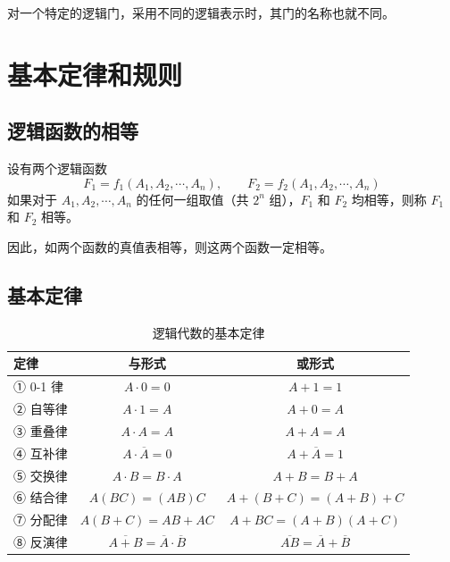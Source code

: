 \begin{note}
	对一个特定的逻辑门，采用不同的逻辑表示时，其门的名称也就不同。
\end{note}

\section{基本定律和规则}
\label{sec:基本定律和规则}

\subsection{逻辑函数的相等}
\label{sec:逻辑函数的相等}

设有两个逻辑函数
\begin{equation}
	F_1=f_1(A_1,A_2,\cdots,A_n),\qquad
	F_2=f_2(A_1,A_2,\cdots,A_n)
	\label{eq:定律:函数定义}
\end{equation}
如果对于 $A_1,A_2,\cdots,A_n$ 的任何一组取值（共 $2^n$ 组），$F_1$ 和 $F_2$ 均相等，则称 $F_1$ 和 $F_2$ 相等。

因此，如两个函数的真值表相等，则这两个函数一定相等。

\subsection{基本定律}
\label{sec:基本定律}

\begin{table}[H]
\centering
\caption{逻辑代数的基本定律}
\label{tab:定律:基本定律}
\begin{tabular}{lcc}
	\toprule
	定律 & 与形式 & 或形式 \\
	\midrule
	① 0-1 律 & $A\cdot0=0$ & $A+1=1$ \\
	② 自等律 & $A\cdot1=A$ & $A+0=A$ \\
	③ 重叠律 & $A\cdot A=A$ & $A+A=A$ \\
	④ 互补律 & $A\cdot\overline{A}=0$ & $A+\overline{A}=1$ \\
	⑤ 交换律 & $A\cdot B=B\cdot A$ & $A+B=B+A$ \\
	⑥ 结合律 & $A(BC)=(AB)C$ & $A+(B+C)=(A+B)+C$ \\
	⑦ 分配律 & $A(B+C)=AB+AC$ & $A+BC=(A+B)(A+C)$ \\
	⑧ 反演律 & $\overline{A+B}=\overline{A}\cdot\overline{B}$ & $\overline{AB}=\overline{A}+\overline{B}$ \\
	\bottomrule
\end{tabular}
\end{table}

